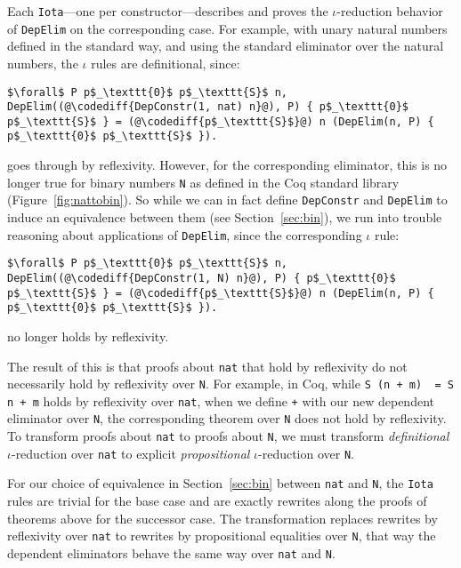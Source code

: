 Each \lstinline{Iota}---one per constructor---describes and proves the $\iota$-reduction behavior
of \lstinline{DepElim} on the corresponding case. For example, with unary natural numbers defined in the standard way,
and using the standard eliminator over the natural numbers, the $\iota$ rules are definitional, since:

\begin{lstlisting}
$\forall$ P p$_\texttt{0}$ p$_\texttt{S}$ n, DepElim((@\codediff{DepConstr(1, nat) n}@), P) { p$_\texttt{0}$ p$_\texttt{S}$ } = (@\codediff{p$_\texttt{S}$}@) n (DepElim(n, P) { p$_\texttt{0}$ p$_\texttt{S}$ }).
\end{lstlisting}
goes through by reflexivity.
However, for the corresponding eliminator, this is no longer true for binary numbers \lstinline{N} as defined in the Coq standard library (Figure~\ref{fig:nattobin}).
So while we can in fact define \lstinline{DepConstr} and \lstinline{DepElim} to induce an equivalence
between them (see Section~\ref{sec:bin}), we run into trouble reasoning about applications of \lstinline{DepElim},
since the corresponding $\iota$ rule:

\begin{lstlisting}
$\forall$ P p$_\texttt{0}$ p$_\texttt{S}$ n, DepElim((@\codediff{DepConstr(1, N) n}@), P) { p$_\texttt{0}$ p$_\texttt{S}$ } = (@\codediff{p$_\texttt{S}$}@) n (DepElim(n, P) { p$_\texttt{0}$ p$_\texttt{S}$ }).
\end{lstlisting}
no longer holds by reflexivity.

The result of this is that proofs about \lstinline{nat} that hold by reflexivity
do not necessarily hold by reflexivity over \lstinline{N}. For example, in Coq,
while \lstinline{S (n + m)  = S n + m} holds by reflexivity over \lstinline{nat},
when we define \lstinline{+} with our new dependent eliminator over \lstinline{N},
the corresponding theorem over \lstinline{N} does not hold by reflexivity.
To transform proofs about \lstinline{nat} to proofs about \lstinline{N}, we must transform \textit{definitional} $\iota$-reduction over \lstinline{nat}
to explicit \textit{propositional} $\iota$-reduction over \lstinline{N}.

For our choice of equivalence in Section~\ref{sec:bin} between \lstinline{nat} and \lstinline{N}, the \lstinline{Iota} rules are trivial
for the base case and are exactly rewrites along the proofs of theorems above for the successor case.
The transformation replaces rewrites by reflexivity over \lstinline{nat} to rewrites by propositional equalities over \lstinline{N},
that way the dependent eliminators behave the same way over \lstinline{nat} and \lstinline{N}.

